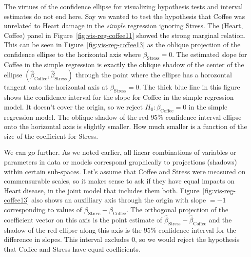 \documentclass[11pt]{article}%
\newcommand*{\figref}[1]{Figure~\ref{#1}}
\newcommand*{\todo}[1]{\marginpar{ToDo:\small{#1}}}
\begin{document}
The virtues of the confidence ellipse for visualizing hypothesis tests and interval estimates
do not end here. Say we wanted to test the hypothesis that Coffee was unrelated to Heart damage
in the \emph{simple} regression ignoring Stress.  The (Heart, Coffee) panel in \figref{fig:vis-reg-coffee11}
showed the strong marginal relation.  This can be seen in \figref{fig:vis-reg-coffee13} as
the oblique projection of the confidence ellipse to the horizontal axis where $\beta_{\mathrm{Stress}}=0$.
The estimated slope for Coffee in the simple regression is exactly the oblique shadow of
the center of the ellipse $(\widehat{\beta}_{\mathrm{Coffee}}, \widehat{\beta}_{\mathrm{Stress}})$
through the point where the ellipse has a horozontal tangent onto the horizontal axis at
$\beta_{\mathrm{Stress}}=0$. The thick blue line in this figure shows the confidence interval
for the slope for Coffee in the simple regression model. It doesn't cover the origin, so 
we reject $H_0: \beta_{\mathrm{Coffee}} = 0$ in the simple regression model.
The oblique shadow of the red 95\% confidence interval ellipse onto the horizontal axis
is slightly smaller.  How much smaller is a function of the size of the coefficient for Stress.

We can go further.  As we noted earlier, all linear combinations of variables or parameters
in data or models correspond graphically to projections (shadows) within certain sub-spaces.
Let's assume that Coffee and Stress were measured on commensurable scales, so it makes sense
to ask if they have equal impacts on Heart disease, in the joint model that includes them both.
\figref{fig:vis-reg-coffee13} also shows an auxilliary axis through the origin with slope $=-1$
corresponding to values of $\beta_{\mathrm{Stress}} - \beta_{\mathrm{Coffee}}$. The orthogonal
projection of the coefficient vector on this axis is the point estimate of 
$\widehat{\beta}_{\mathrm{Stress}} - \widehat{\beta}_{\mathrm{Coffee}}$
and the shadow of the red ellipse along this axis is the 95\% confidence interval
for the difference in slopes. This interval excludes 0, so we would reject the hypothesis
that Coffee and Stress have equal coefficients.







\end{document}
